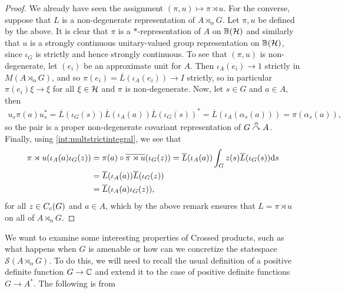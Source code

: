 \begin{proof}
	We already have seen the assignment $(\pi,u) \mapsto \pi \rtimes u$. For the converse, suppose that $L$ is a non-degenerate representation of $A \rtimes_\alpha G$. Let $\pi, u$ be defined by the above. It is clear that $\pi$ is a $*$-representation of $A$ on $\mathbb{B}(\mathcal{H})$ and similarly that $u$ is a strongly continuous unitary-valued group representation on $\mathbb{B}(\mathcal{H})$, since $\iota_G$ is strictly and hence strongly continuous. To see that $(\pi,u)$ is non-degenerate, let $(e_i)$ be an approximate unit for $A$. Then $\iota_A(e_i) \to 1$ strictly in $M(A \rtimes_\alpha G)$, and so $\pi(e_i) = \overline L(\iota_A(e_i)) \to I$ strictly, so in particular $\pi(e_i) \xi \to \xi$ for all $\xi \in \mathcal{H}$ and $\pi$ is non-degenerate. Now, let $s \in G$ and $a \in A$, then
	\begin{align*}
		u_s \pi(a) u_s^* = \overline L(\iota_G(s) ) \overline L (\iota_A(a)) \overline L(\iota_G(s))^* = \overline L( \iota_A(\alpha_s(a))) = \pi(\alpha_{s}(a)),
	\end{align*}
	so the pair is a proper non-degenerate covariant representation of $G \stackrel{\alpha}{\curvearrowright} A$. Finally, using \cref{int:multstrictintegral}, we see that
\begin{align*}
	\pi \rtimes u(\iota_A(a) \iota_G(z)) &= \pi(a) \circ \overline{\pi \rtimes u}(\iota_G(z)) = \overline L(\iota_A(a)) \int_G z(s) \overline L(\iota_G(s)) \mathrm{d} s \\
	&= \overline L(\iota_A(a)) \overline L(\iota_G(z)) \\
	&= \overline L(\iota_A(a) \iota_G(z)),
\end{align*}
for all $z \in C_c(G)$ and $a \in A$, which by the above remark ensures that $L = \pi \rtimes u$ on all of $A \rtimes_ \alpha G$.
\end{proof}

We want to examine some interesting properties of Crossed products, such as what happens when $G$ is amenable or how can we concretize the statespace $\mathcal{S}(A\rtimes_\alpha G)$. To do this, we will need to recall the usual definition of a positive definite function $G \to \mathbb{C}$ and extend it to the case of positive definite functions $G \to A^*$. The following is from \cite{pedersenalgauto}


